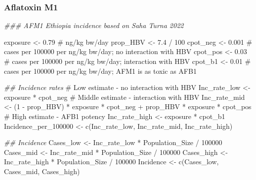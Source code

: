 \documentclass[
  letterpaper,
  DIV=11,
  numbers=noendperiod]{scrartcl}
\newenvironment{Shaded}{\begin{snugshade}}{\end{snugshade}}
\newcommand{\CommentTok}[1]{\textcolor[rgb]{0.37,0.37,0.37}{#1}}
\newcommand{\DecValTok}[1]{\textcolor[rgb]{0.68,0.00,0.00}{#1}}
\newcommand{\DocumentationTok}[1]{\textcolor[rgb]{0.37,0.37,0.37}{\textit{#1}}}
\newcommand{\FloatTok}[1]{\textcolor[rgb]{0.68,0.00,0.00}{#1}}
\newcommand{\FunctionTok}[1]{\textcolor[rgb]{0.28,0.35,0.67}{#1}}
\newcommand{\NormalTok}[1]{\textcolor[rgb]{0.00,0.23,0.31}{#1}}
\newcommand{\OtherTok}[1]{\textcolor[rgb]{0.00,0.23,0.31}{#1}}
\newcommand{\SpecialCharTok}[1]{\textcolor[rgb]{0.37,0.37,0.37}{#1}}
\begin{document}
\subsubsection{Aflatoxin M1}\label{aflatoxin-m1}

\begin{Shaded}
\begin{Highlighting}[]
\DocumentationTok{\#\#\# AFM1 Ethiopia incidence based on Saha Turna 2022}

\NormalTok{exposure }\OtherTok{\textless{}{-}} \FloatTok{0.79} \CommentTok{\# ng/kg bw/day}
\NormalTok{prop\_HBV }\OtherTok{\textless{}{-}} \FloatTok{7.4} \SpecialCharTok{/} \DecValTok{100}
\NormalTok{cpot\_neg }\OtherTok{\textless{}{-}} \FloatTok{0.001} \CommentTok{\# cases per 100000 per ng/kg bw/day; no interaction with HBV}
\NormalTok{cpot\_pos }\OtherTok{\textless{}{-}} \FloatTok{0.03} \CommentTok{\# cases per 100000 per ng/kg bw/day; interaction with HBV}
\NormalTok{cpot\_b1 }\OtherTok{\textless{}{-}} \FloatTok{0.01} \CommentTok{\# cases per 100000 per ng/kg bw/day; AFM1 is as toxic as AFB1}

\DocumentationTok{\#\# Incidence rates}
\CommentTok{\# Low estimate {-} no interaction with HBV}
\NormalTok{Inc\_rate\_low }\OtherTok{\textless{}{-}}\NormalTok{ exposure }\SpecialCharTok{*}\NormalTok{ cpot\_neg}
\CommentTok{\# Middle estimate {-} interaction with HBV}
\NormalTok{Inc\_rate\_mid }\OtherTok{\textless{}{-}}\NormalTok{ (}\DecValTok{1} \SpecialCharTok{{-}}\NormalTok{ prop\_HBV) }\SpecialCharTok{*}\NormalTok{ exposure }\SpecialCharTok{*}\NormalTok{ cpot\_neg }\SpecialCharTok{+}\NormalTok{ prop\_HBV }\SpecialCharTok{*}\NormalTok{ exposure }\SpecialCharTok{*}\NormalTok{ cpot\_pos}
\CommentTok{\# High estimate {-} AFB1 potency}
\NormalTok{Inc\_rate\_high }\OtherTok{\textless{}{-}}\NormalTok{ exposure }\SpecialCharTok{*}\NormalTok{ cpot\_b1}
\NormalTok{Incidence\_per\_100000 }\OtherTok{\textless{}{-}} \FunctionTok{c}\NormalTok{(Inc\_rate\_low, Inc\_rate\_mid, Inc\_rate\_high)}


\DocumentationTok{\#\# Incidence}
\NormalTok{Cases\_low }\OtherTok{\textless{}{-}}\NormalTok{ Inc\_rate\_low }\SpecialCharTok{*}\NormalTok{ Population\_Size }\SpecialCharTok{/} \DecValTok{100000}
\NormalTok{Cases\_mid }\OtherTok{\textless{}{-}}\NormalTok{ Inc\_rate\_mid }\SpecialCharTok{*}\NormalTok{ Population\_Size }\SpecialCharTok{/} \DecValTok{100000}
\NormalTok{Cases\_high }\OtherTok{\textless{}{-}}\NormalTok{ Inc\_rate\_high }\SpecialCharTok{*}\NormalTok{ Population\_Size }\SpecialCharTok{/} \DecValTok{100000}
\NormalTok{Incidence }\OtherTok{\textless{}{-}} \FunctionTok{c}\NormalTok{(Cases\_low, Cases\_mid, Cases\_high)}


\end{Highlighting}
\end{Shaded}
\end{document}
